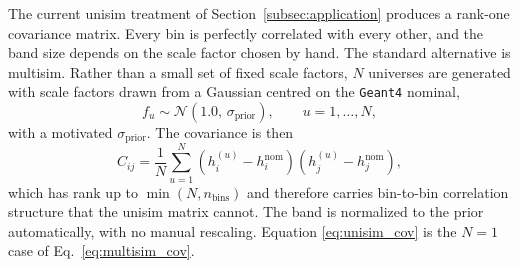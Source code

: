 \documentclass[%
article,
nofootinbib
]{revtex4-2}
\DeclareRobustCommand{\gfour}{\texttt{Geant4}}
\begin{document}
The current unisim treatment of Section~\ref{subsec:application} produces a rank-one
covariance matrix. Every bin is perfectly correlated with every other, and the
band size depends on the scale factor chosen by hand. The standard alternative is multisim. Rather than a small set of fixed scale
factors, $N$ universes are generated with scale factors drawn from a Gaussian
centred on the \gfour{} nominal,
\begin{equation}
\label{eq:multisim_draw}
f_u \sim \mathcal{N}(1.0,\, \sigma_{\text{prior}}),
\qquad u = 1,\ldots,N,
\end{equation}
with a motivated $\sigma_{\text{prior}}$. The covariance is
then
\begin{equation}
\label{eq:multisim_cov}
C_{ij} = \frac{1}{N}\sum_{u=1}^{N}
         \left(h^{(u)}_i - h^{\text{nom}}_i\right)
         \left(h^{(u)}_j - h^{\text{nom}}_j\right),
\end{equation}
which has rank up to $\min(N, n_{\text{bins}})$ and therefore carries
bin-to-bin correlation structure that the unisim matrix cannot. The band is
normalized to the prior automatically, with no manual rescaling. Equation
\ref{eq:unisim_cov} is the $N = 1$ case of Eq.~\ref{eq:multisim_cov}.
\fi





\end{document}

